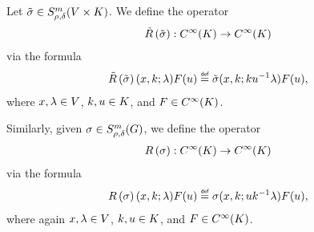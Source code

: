 \begin{definition}
    Let $\tilde \sigma \in \SymbolClass[\GroupDirect]{m}{\rho, \delta}$.
    We define the operator
    \begin{align*}
        \Rotation {\tilde \sigma} : \SmoothFunctions \CompactGroup \to \SmoothFunctions \CompactGroup
    \end{align*}
    via the formula
    \begin{align*}
        \Rotation {\tilde \sigma}(x, k; \lambda) F(u) \defeq \tilde \sigma(x, k; k u^{-1} \lambda) F(u),
    \end{align*}
    where $x, \lambda \in \VectorSpace$, $k, u \in \CompactGroup$, and $F \in \SmoothFunctions \CompactGroup$.

    Similarly, given $\sigma \in \SymbolClass m {\rho, \delta}$,
    we define the operator
    \begin{align*}
        \InverseRotation \sigma : \SmoothFunctions \CompactGroup \to \SmoothFunctions \CompactGroup
    \end{align*}
    via the formula
    \begin{align*}
        \InverseRotation \sigma (x, k; \lambda) F(u) \defeq \sigma(x, k; u k^{-1} \lambda) F(u),
    \end{align*}
    where again $x, \lambda \in \VectorSpace$, $k, u \in \CompactGroup$, and $F \in \SmoothFunctions \CompactGroup$.
\end{definition}

